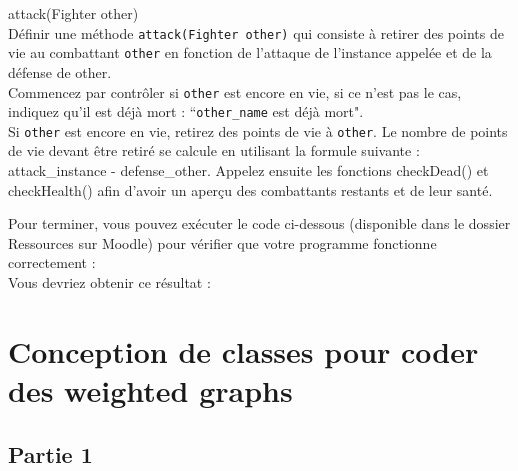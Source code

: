 \begin{Exercice}[10 minutes] attack(Fighter other)\\
    Définir une méthode \lstinline{attack(Fighter other)} qui consiste à retirer des points de vie au combattant \lstinline{other} en fonction de l'attaque de l'instance appelée et de la défense de other. \\
    
    Commencez par contrôler si \lstinline{other} est encore en vie, si ce n'est pas le cas, indiquez qu'il est déjà mort : ``\lstinline{other_name} est déjà mort". \\
    
     Si \lstinline{other} est encore en vie, retirez des points de vie à \lstinline{other}. Le nombre de points de vie devant être retiré se calcule en utilisant la formule suivante : attack\_instance - defense\_other. Appelez ensuite les fonctions checkDead() et checkHealth() afin d'avoir un aperçu des combattants restants et de leur santé.
    


\begin{solution}
	
\end{solution}
\end{Exercice}


Pour terminer, vous pouvez exécuter le code ci-dessous (disponible dans le dossier Ressources sur Moodle) pour vérifier que votre programme fonctionne correctement : \\



Vous devriez obtenir ce résultat : \\



\newpage

\section{Conception de classes pour coder des weighted graphs}

\subsection{Partie 1}


